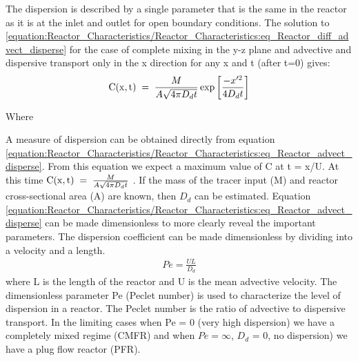 \documentclass[letterpaper,10pt,english]{sphinxmanual}
\begin{document}
The dispersion is described by a single parameter that is the same in the reactor as it is at the inlet and outlet for open boundary conditions. The solution to \eqref{equation:Reactor_Characteristics/Reactor_Characteristics:eq_Reactor_diff_advect_disperse} for the case of complete mixing in the y-z plane and advective and dispersive transport only in the x direction for any x and t (after t=0) gives:
\begin{equation}\label{equation:Reactor_Characteristics/Reactor_Characteristics:eq_Reactor_advect_disperse}
\begin{split}{\rm C(x,t)\; }={\rm \; }\frac{M}{A\sqrt{4\pi D_{d} t} } \exp \left[\frac{-x'^{2} }{4D_{d} t} \right]\end{split}
\end{equation}\begin{description}
\item[{Where}] \leavevmode
{}

\end{description}

A measure of dispersion can be obtained directly from equation \eqref{equation:Reactor_Characteristics/Reactor_Characteristics:eq_Reactor_advect_disperse}. From this equation we expect a maximum value of C at t = x/U. At this time \({\rm C(x,t)\; }={\rm \; }\frac{M}{A\sqrt{4\pi D_{d} t} }\) . If the mass of the tracer input (M) and reactor cross-sectional area (A) are known, then \(D_{d}\) can be estimated. Equation \eqref{equation:Reactor_Characteristics/Reactor_Characteristics:eq_Reactor_advect_disperse} can be made dimensionless to more clearly reveal the important parameters. The dispersion coefficient can be made dimensionless by dividing into a velocity and a length.
\begin{equation}\label{equation:Reactor_Characteristics/Reactor_Characteristics:eq_Reactor_Pe}
\begin{split}Pe=\frac{UL}{D_{d}}\end{split}
\end{equation}
where L is the length of the reactor and U is the mean advective velocity. The dimensionless parameter Pe (Peclet number) is used to characterize the level of dispersion in a reactor. The Peclet number is the ratio of advective to dispersive transport. In the limiting cases when Pe = 0 (very high dispersion) we have a completely mixed regime (CMFR) and when \(Pe = \mathrm{\infty}\), \(D_{d}\) = 0, no dispersion) we have a plug flow reactor (PFR).
\end{document}
